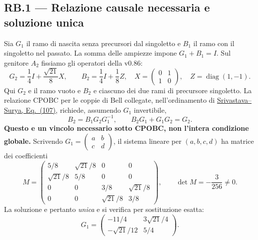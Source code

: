 \documentclass[11pt,a4paper]{article}
\begin{document}
\subsection*{RB.1 --- Relazione causale necessaria e soluzione unica}
Sia $G_1$ il ramo di nascita senza precursori dal singoletto e $B_1$ il ramo con il singoletto nel passato. La somma delle ampiezze impone $G_1+B_1=I$. Sul genitore $A_2$ fissiamo gli operatori della v0.86:
\begin{equation}
 G_2=\frac14I+\frac{\sqrt{21}}8X,\qquad
 B_2=\frac14I+\frac18Z,\quad
 X=\begin{pmatrix}0&1\\1&0\end{pmatrix},\quad Z=\operatorname{diag}(1,-1).\tag{RB.1}
\end{equation}
Qui $G_2$ e il ramo vuoto e $B_2$ e ciascuno dei due rami di precursore singoletto. La relazione CPOBC per le coppie di Bell collegate, nell'ordinamento di \href{https://arxiv.org/html/2603.25503}{Srivastava--Surya, Eq.~(107)}, richiede, assumendo $G_1$ invertibile,
\begin{equation}
 B_2=B_1G_2G_1^{-1},\qquad
 \boxed{B_2G_1+G_1G_2=G_2}.\tag{RB.2}
\end{equation}
\textbf{Questo e un vincolo necessario sotto CPOBC, non l'intera condizione globale.} Scrivendo $G_1=\left(\begin{smallmatrix}a&b\\c&d\end{smallmatrix}\right)$, il sistema lineare per $(a,b,c,d)$ ha matrice dei coefficienti
\begin{equation}
 M=\begin{pmatrix}
 5/8&\sqrt{21}/8&0&0\\
 \sqrt{21}/8&5/8&0&0\\
 0&0&3/8&\sqrt{21}/8\\
 0&0&\sqrt{21}/8&3/8
 \end{pmatrix},\qquad
 \boxed{\det M=-\frac3{256}\ne0}.\tag{RB.3}
\end{equation}
La soluzione e pertanto \emph{unica} e si verifica per sostituzione esatta:
\begin{equation}
 \boxed{G_1=\begin{pmatrix}-11/4&3\sqrt{21}/4\\-\sqrt{21}/12&5/4\end{pmatrix}}.\tag{RB.4}
\end{equation}

\clearpage
\end{document}
